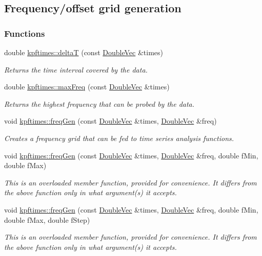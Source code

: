 \hypertarget{group__grid}{
\subsection{Frequency/offset grid generation}
\label{group__grid}
}
\subsubsection*{Functions}
\begin{DoxyCompactItemize}
\item 
double \hyperlink{group__grid_gad3ff4682c1b247c928c495f29c3dc7a2}{kpftimes::deltaT} (const \hyperlink{dft_8h_ae5d5553d1db3abe03c161a5ffd0bf9ad}{DoubleVec} \&times)
\begin{DoxyCompactList}\small\item\em Returns the time interval covered by the data. \end{DoxyCompactList}\item 
double \hyperlink{group__grid_gae62bc6f792fbbc2447cb85dbac341c5f}{kpftimes::maxFreq} (const \hyperlink{dft_8h_ae5d5553d1db3abe03c161a5ffd0bf9ad}{DoubleVec} \&times)
\begin{DoxyCompactList}\small\item\em Returns the highest frequency that can be probed by the data. \end{DoxyCompactList}\item 
void \hyperlink{group__grid_ga591c0083b481ff4bbae69be4f33318ef}{kpftimes::freqGen} (const \hyperlink{dft_8h_ae5d5553d1db3abe03c161a5ffd0bf9ad}{DoubleVec} \&times, \hyperlink{dft_8h_ae5d5553d1db3abe03c161a5ffd0bf9ad}{DoubleVec} \&freq)
\begin{DoxyCompactList}\small\item\em Creates a frequency grid that can be fed to time series analysis functions. \end{DoxyCompactList}\item 
void \hyperlink{group__grid_ga1c2d7d03f7a81eef3899d5a073d5677a}{kpftimes::freqGen} (const \hyperlink{dft_8h_ae5d5553d1db3abe03c161a5ffd0bf9ad}{DoubleVec} \&times, \hyperlink{dft_8h_ae5d5553d1db3abe03c161a5ffd0bf9ad}{DoubleVec} \&freq, double fMin, double fMax)
\begin{DoxyCompactList}\small\item\em This is an overloaded member function, provided for convenience. It differs from the above function only in what argument(s) it accepts. \end{DoxyCompactList}\item 
void \hyperlink{group__grid_ga5fc61b434afae334b5ec95e1ab0f7093}{kpftimes::freqGen} (const \hyperlink{dft_8h_ae5d5553d1db3abe03c161a5ffd0bf9ad}{DoubleVec} \&times, \hyperlink{dft_8h_ae5d5553d1db3abe03c161a5ffd0bf9ad}{DoubleVec} \&freq, double fMin, double fMax, double fStep)
\begin{DoxyCompactList}\small\item\em This is an overloaded member function, provided for convenience. It differs from the above function only in what argument(s) it accepts. \end{DoxyCompactList}\end{DoxyCompactItemize}


